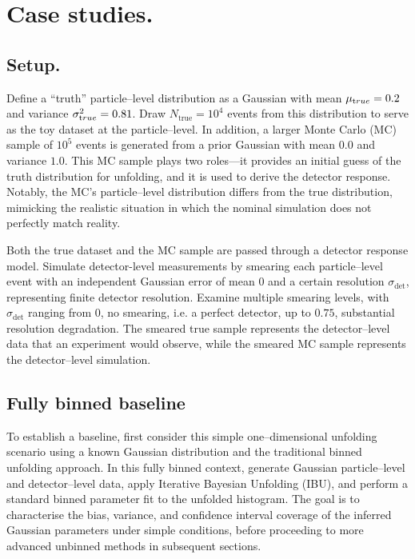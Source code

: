\section{Case studies.}
\label{sec:case-studies}
    \subsection{Setup.}
    \label{subsec:setup}
        Define a ``truth'' particle--level distribution as a Gaussian with mean $\mu_{\text true}=0.2$ and variance $\sigma^2_{\text true}=0.81$.
        Draw $N_{\text{true}}=10^4$ events from this distribution to serve as the toy dataset at the particle--level.
        In addition, a larger Monte Carlo (MC) sample of $10^5$ events is generated from a prior Gaussian with mean \(0.0\) and variance \(1.0.\)
        This MC sample plays two roles---it provides an initial guess of the truth distribution for unfolding, and it is used to derive the detector response.
        Notably, the MC’s particle--level distribution differs from the true distribution, mimicking the realistic situation in which the nominal simulation does not perfectly match reality.

        Both the true dataset and the MC sample are passed through a detector response model.
        Simulate detector-level measurements by smearing each particle--level event with an independent Gaussian error of mean 0 and a certain resolution $\sigma_{\text{det}}$, representing finite detector resolution.
        Examine multiple smearing levels, with $\sigma_{\text{det}}$ ranging from \(0\), no smearing, i.e. a perfect detector, up to \(0.75\), substantial resolution degradation.
        The smeared true sample represents the detector--level data that an experiment would observe, while the smeared MC sample represents the detector--level simulation.
        
    \subsection{Fully binned baseline}
    \label{subsec:fully_binned_demo}
        To establish a baseline, first consider this simple one--dimensional unfolding scenario using a known Gaussian distribution and the traditional binned unfolding approach.
        In this fully binned context, generate Gaussian particle--level and detector--level data, apply Iterative Bayesian Unfolding (IBU), and perform a standard binned parameter fit to the unfolded histogram.
        The goal is to characterise the bias, variance, and confidence interval coverage of the inferred Gaussian parameters under simple conditions, before proceeding to more advanced unbinned methods in subsequent sections.
        
